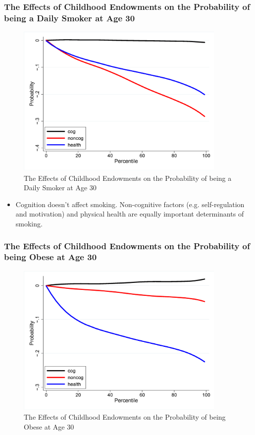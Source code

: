 \subsubsection{The Effects of Childhood Endowments on the Probability of being a Daily Smoker at Age 30}    
\begin{figure}[H]%
                \centering
                \includegraphics[width=4in]{images/ch3/45.png}
                \caption {The Effects of Childhood Endowments on the Probability of
being a Daily Smoker at Age 30}
                \label{fig:label}
            \end{figure} 

\begin{itemize}
    \item Cognition doesn't affect smoking. Non-cognitive factors (e.g. self-regulation and motivation) and physical health are equally important determinants of smoking.
\end{itemize}

\subsubsection{The Effects of Childhood Endowments on the Probability of being Obese at Age 30}    
\begin{figure}[H]%
                \centering
                \includegraphics[width=4in]{images/ch3/46.png}
                \caption {The Effects of Childhood Endowments on the Probability of
being Obese at Age 30}
                \label{fig:label}
            \end{figure} 
            
